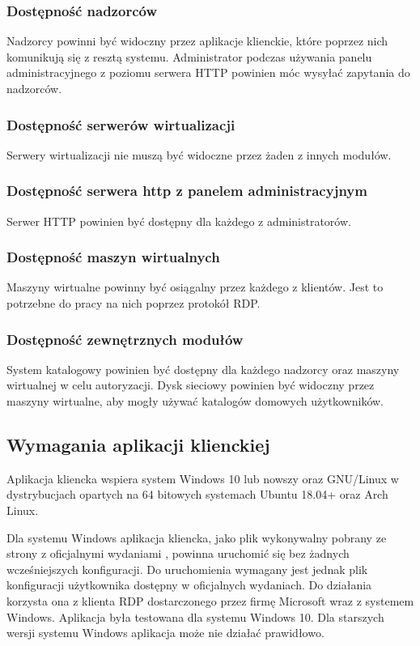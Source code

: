 \documentclass[../opis-rozwiazania.tex]{subfiles}
\begin{document}
\subsubsection{Dostępność nadzorców}
Nadzorcy powinni być widoczny przez aplikacje klienckie, które poprzez nich komunikują się z resztą systemu.
Administrator podczas używania panelu administracyjnego z poziomu serwera HTTP powinien móc wysyłać zapytania do nadzorców.

\subsubsection{Dostępność serwerów wirtualizacji}
Serwery wirtualizacji nie muszą być widoczne przez żaden z innych modułów.

\subsubsection{Dostępność serwera http z panelem administracyjnym}
Serwer HTTP powinien być dostępny dla każdego z administratorów.

\subsubsection{Dostępność maszyn wirtualnych}
Maszyny wirtualne powinny być osiągalny przez każdego z klientów.
Jest to potrzebne do pracy na nich poprzez protokół RDP.

\subsubsection{Dostępność zewnętrznych modułów}
System katalogowy powinien być dostępny dla każdego nadzorcy oraz maszyny wirtualnej w celu autoryzacji.
Dysk sieciowy powinien być widoczny przez maszyny wirtualne, aby mogły używać katalogów domowych użytkowników.

\subsection{Wymagania aplikacji klienckiej}
Aplikacja kliencka wspiera system Windows 10 lub nowszy oraz GNU/Linux w dystrybucjach opartych na 64 bitowych systemach Ubuntu 18.04+ oraz Arch Linux.

Dla systemu Windows aplikacja kliencka, jako plik wykonywalny pobrany ze strony z oficjalnymi wydaniami \parencite{ocd-client-releases}, powinna uruchomić się bez żadnych wcześniejszych konfiguracji. Do uruchomienia wymagany jest jednak plik konfiguracji użytkownika dostępny w oficjalnych wydaniach.
Do działania korzysta ona z klienta RDP dostarczonego przez firmę Microsoft wraz z systemem Windows.
Aplikacja była testowana dla systemu Windows 10.
Dla starszych wersji systemu Windows aplikacja może nie działać prawidłowo.
\end{document}
